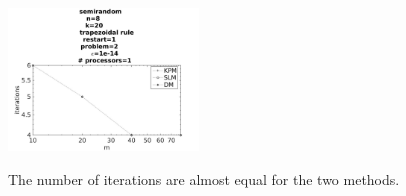 \begin{figure}[H]
        \centering

                \includegraphics[width=0.45\textwidth]{../MATLAB/fig/vsresultiter.jpg}
        \label{fig:vsresultiter}
        \caption{The number of iterations are almost equal for the two methods.}
\end{figure}

